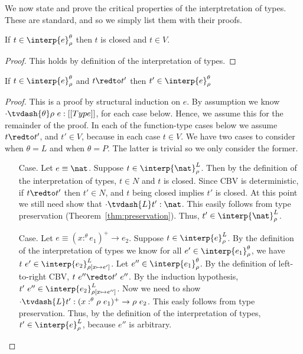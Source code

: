 We now state and prove the critical properties of the interptretation
of types.  These are standard, and so we simply list them with their
proofs.

\begin{lemma}[$\CRI$]
  \label{lemma:cri}
  If $t \in \interp{e}^\theta_\rho$ then $t$ is closed and $t \in V$.
\end{lemma}
\begin{proof}
  This holds by definition of the interpretation of types.
\end{proof}

\begin{lemma}[$\CRII$]
  \label{lemma:crii}
  If $t \in \interp{e}^\theta_\rho$ and $t \redto t'$ then $t' \in \interp{e}^\theta_\rho$
\end{lemma}
\begin{proof}
  This is a proof by structural induction on $e$.  By assumption we know 
  $\cdot \tvdash{\theta} \rho\ e:[[Type]]$, for each case below.  Hence, we assume this for
  the remainder of the proof.  In each of the function-type cases below we 
  assume $t \redto t'$, and $t' \in V$, because in each case $t \in V$.  We have two cases
  to consider when $\theta = L$ and when $\theta = P$.  The latter is trivial so we only
  consider the former.

  \begin{itemize}
  \item[Case.] Let $e \equiv \nat$.  
    Suppose $t \in \interp{\nat}^L_\rho$.  Then by the definition of the 
    interpretation of types, $t \in N$ and $t$ is closed.  Since CBV is deterministic,
    if $t \redto t'$ then $t' \in N$, and $t$ being closed implies $t'$ is closed.  At this
    point we still need show that $\cdot \tvdash{L} t':\nat$.  This easily follows from
    type preservation (Theorem~\ref{thm:preservation}). Thus, $t' \in \interp{\nat}^L_\rho$.

  \item[Case.] Let $e \equiv (x :^\theta e_1)^+ \rightarrow e_2$.    
    Suppose $t \in \interp{e}^L_\rho$.  By the definition of the interpretation of types we know 
    for all $e' \in \interp{e_1}^\theta_\rho$, we have 
    $t\ e' \in \interp{e_2}^L_{\rho[x \mapsto e']}$.  
    Let $e'' \in \interp{e_1}^\theta_\rho$.  By the definition of left-to-right CBV, 
    $t\ e'' \redto t'\ e''$.  By the induction hypothesis, 
    $t'\ e'' \in \interp{e_2}^L_{\rho[x \mapsto e'']}$.  Now we need to show
    $\cdot \tvdash{L} t':(x :^\theta \rho\ e_1)^+ \rightarrow \rho\ e_2$.  This easly follows
    from type preservation.  Thus, by the definition 
    of the interpretation of types, $t' \in \interp{e}^L_{\rho}$, because $e''$ is arbitrary.
    

\end{itemize}
\end{proof}
